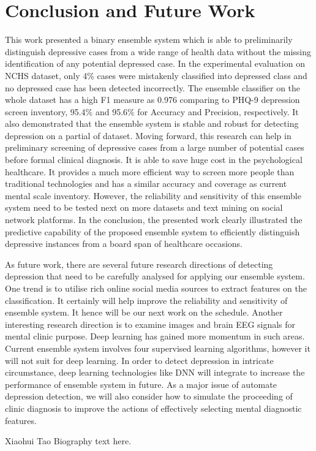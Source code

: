 \documentclass[10pt,journal,compsoc]{IEEEtran}
\begin{document}
\section{Conclusion and Future Work}
This work presented a binary ensemble system which is able to preliminarily distinguish depressive cases from a wide range of health data without the missing identification of any potential depressed case. In the experimental evaluation on NCHS dataset, only 4\% cases were mistakenly classified into depressed class and no depressed case has been detected incorrectly. The ensemble classifier on the whole dataset has a high F1 measure as 0.976 comparing to PHQ-9 depression screen inventory, 95.4\% and 95.6\% for Accuracy and Precision, respectively. It also demonstrated that the ensemble system is stable and robust for detecting depression on a partial of dataset. Moving forward, this research can help in preliminary screening of depressive cases from a large number of potential cases before formal clinical diagnosis. It is able to save huge cost in the psychological healthcare. It provides a much more efficient way to screen more people than traditional technologies and has a similar accuracy and coverage as current mental scale inventory. However, the reliability and sensitivity of this ensemble system need to be tested next on more datasets and text mining on social network platforms. In the conclusion, the presented work clearly illustrated the predictive capability of the proposed ensemble system to efficiently distinguish depressive instances from a board span of healthcare occasions.

As future work, there are several future research directions of detecting depression that need to be carefully analysed for applying our ensemble system. One trend is to utilise rich online social media sources to extract features on the classification. It certainly will help improve the reliability and sensitivity of ensemble system. It hence will be our next work on the schedule.  Another interesting research direction is to examine images and brain EEG signals for mental clinic purpose. Deep learning has gained more momentum in such areas. Current ensemble system involves four supervised learning algorithms, however it will not suit for deep learning. In order to detect depression in intricate circumstance, deep learning technologies like DNN will integrate to increase the performance of ensemble system in future. As a major issue of automate depression detection, we will also consider how to simulate the proceeding of clinic diagnosis to improve the actions of effectively selecting mental diagnostic features. 
%
%
%
\ifCLASSOPTIONcaptionsoff
  \newpage
\fi



%
%
%
\begin{IEEEbiography}{Xiaohui Tao}
Biography text here.
\end{IEEEbiography}
%
%
%
\end{document}
